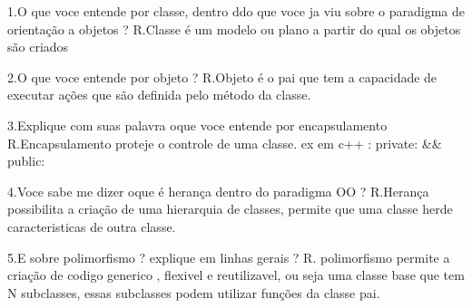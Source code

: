 1.O que voce entende por classe, dentro ddo que voce ja viu sobre o paradigma de orientação
a objetos ?
R.Classe é um modelo ou plano a partir do qual os objetos são criados

2.O que voce entende por objeto ?
R.Objeto é o pai que tem a capacidade de executar ações que são definida pelo método
da classe.

3.Explique com suas palavra oque voce entende por encapsulamento 
R.Encapsulamento proteje o controle de uma classe. ex em c++ : private: && public:

4.Voce sabe me dizer oque é herança dentro do paradigma OO ?
R.Herança possibilita a criação de uma hierarquia de classes, permite que uma classe herde 
caracteristicas de outra classe.

5.E sobre polimorfismo ? explique em linhas gerais ?
R. polimorfismo permite a criação de codigo generico , flexivel e reutilizavel,
ou seja uma classe base que tem N subclasses, essas subclasses podem utilizar funções
da classe pai.
